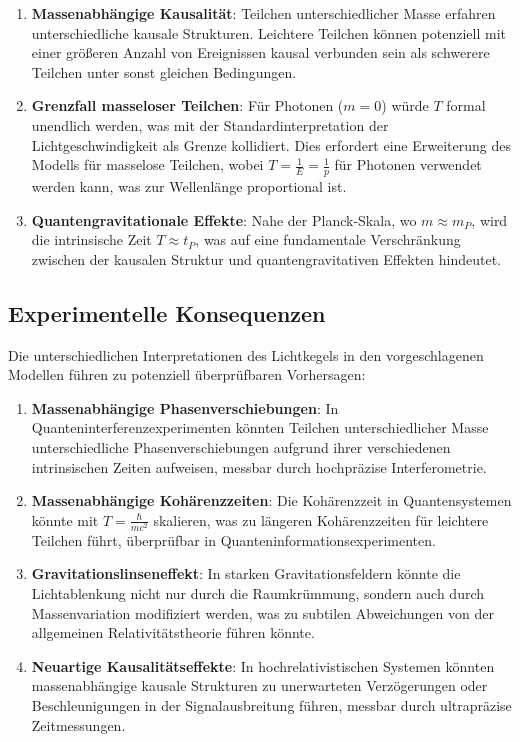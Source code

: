 \documentclass[a4paper,12pt]{article}
\begin{document}
	\begin{enumerate}
		\item \textbf{Massenabhängige Kausalität}: Teilchen unterschiedlicher Masse erfahren unterschiedliche kausale Strukturen. Leichtere Teilchen können potenziell mit einer größeren Anzahl von Ereignissen kausal verbunden sein als schwerere Teilchen unter sonst gleichen Bedingungen.
		\item \textbf{Grenzfall masseloser Teilchen}: Für Photonen (\( m = 0 \)) würde \( T \) formal unendlich werden, was mit der Standardinterpretation der Lichtgeschwindigkeit als Grenze kollidiert. Dies erfordert eine Erweiterung des Modells für masselose Teilchen, wobei \( T = \frac{1}{E} = \frac{1}{p} \) für Photonen verwendet werden kann, was zur Wellenlänge proportional ist.
		\item \textbf{Quantengravitationale Effekte}: Nahe der Planck-Skala, wo \( m \approx m_P \), wird die intrinsische Zeit \( T \approx t_P \), was auf eine fundamentale Verschränkung zwischen der kausalen Struktur und quantengravitativen Effekten hindeutet.
	\end{enumerate}
	
	\subsection{Experimentelle Konsequenzen}
	Die unterschiedlichen Interpretationen des Lichtkegels in den vorgeschlagenen Modellen führen zu potenziell überprüfbaren Vorhersagen:
	
	\begin{enumerate}
		\item \textbf{Massenabhängige Phasenverschiebungen}: In Quanteninterferenzexperimenten könnten Teilchen unterschiedlicher Masse unterschiedliche Phasenverschiebungen aufgrund ihrer verschiedenen intrinsischen Zeiten aufweisen, messbar durch hochpräzise Interferometrie.
		\item \textbf{Massenabhängige Kohärenzzeiten}: Die Kohärenzzeit in Quantensystemen könnte mit \( T = \frac{\hbar}{m c^2} \) skalieren, was zu längeren Kohärenzzeiten für leichtere Teilchen führt, überprüfbar in Quanteninformationsexperimenten.
		\item \textbf{Gravitationslinseneffekt}: In starken Gravitationsfeldern könnte die Lichtablenkung nicht nur durch die Raumkrümmung, sondern auch durch Massenvariation modifiziert werden, was zu subtilen Abweichungen von der allgemeinen Relativitätstheorie führen könnte.
		\item \textbf{Neuartige Kausalitätseffekte}: In hochrelativistischen Systemen könnten massenabhängige kausale Strukturen zu unerwarteten Verzögerungen oder Beschleunigungen in der Signalausbreitung führen, messbar durch ultrapräzise Zeitmessungen.
	\end{enumerate}
	
\end{document}
